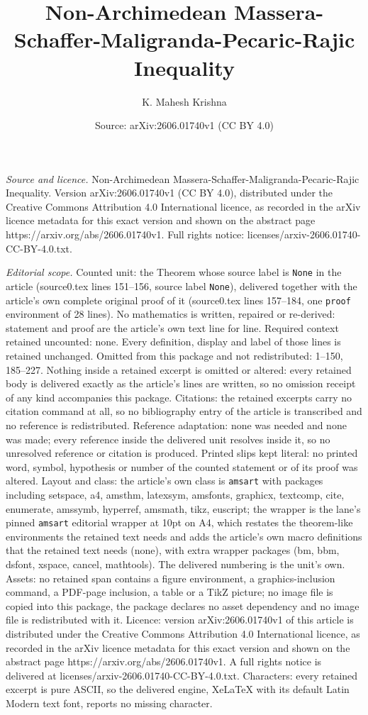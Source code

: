 \documentclass[10pt,a4paper]{amsart}
\title[Non-Archimedean Massera-Schaffer-Maligranda-Pecaric-Rajic In]{Non-Archimedean Massera-Schaffer-Maligranda-Pecaric-Rajic Inequality}
\author{K. Mahesh Krishna}
\date{Source: arXiv:2606.01740v1 (CC BY 4.0)}
\begin{document}
\maketitle

\noindent\emph{Source and licence.} Non-Archimedean Massera-Schaffer-Maligranda-Pecaric-Rajic Inequality. Version arXiv:2606.01740v1 (CC BY 4.0), distributed under the Creative Commons Attribution 4.0 International licence, as recorded in the arXiv licence metadata for this exact version and shown on the abstract page https://arxiv.org/abs/2606.01740v1. Full rights notice: licenses/arxiv-2606.01740-CC-BY-4.0.txt.\par\smallskip

\noindent\textit{Editorial scope.} Counted unit: the Theorem whose source label is \texttt{None} in the article (source0.tex lines 151--156, source label \texttt{None}), delivered together with the article's own complete original proof of it (source0.tex lines 157--184, one \texttt{proof} environment of 28 lines). No mathematics is written, repaired or re-derived: statement and proof are the article's own text line for line. Required context retained uncounted: none. Every definition, display and label of those lines is retained unchanged. Omitted from this package and not redistributed: 1--150, 185--227. Nothing inside a retained excerpt is omitted or altered: every retained body is delivered exactly as the article's lines are written, so no omission receipt of any kind accompanies this package. Citations: the retained excerpts carry no citation command at all, so no bibliography entry of the article is transcribed and no reference is redistributed. Reference adaptation: none was needed and none was made; every reference inside the delivered unit resolves inside it, so no unresolved reference or citation is produced. Printed slips kept literal: no printed word, symbol, hypothesis or number of the counted statement or of its proof was altered. Layout and class: the article's own class is \texttt{amsart} with packages including setspace, a4, amsthm, latexsym, amsfonts, graphicx, textcomp, cite, enumerate, amssymb, hyperref, amsmath, tikz, euscript; the wrapper is the lane's pinned \texttt{amsart} editorial wrapper at 10pt on A4, which restates the theorem-like environments the retained text needs and adds the article's own macro definitions that the retained text needs (none), with extra wrapper packages (bm, bbm, dsfont, xspace, cancel, mathtools). The delivered numbering is the unit's own. Assets: no retained span contains a figure environment, a graphics-inclusion command, a PDF-page inclusion, a table or a TikZ picture; no image file is copied into this package, the package declares no asset dependency and no image file is redistributed with it. Licence: version arXiv:2606.01740v1 of this article is distributed under the Creative Commons Attribution 4.0 International licence, as recorded in the arXiv licence metadata for this exact version and shown on the abstract page https://arxiv.org/abs/2606.01740v1. A full rights notice is delivered at licenses/arxiv-2606.01740-CC-BY-4.0.txt. Characters: every retained excerpt is pure ASCII, so the delivered engine, XeLaTeX with its default Latin Modern text font, reports no missing character.
\end{document}
